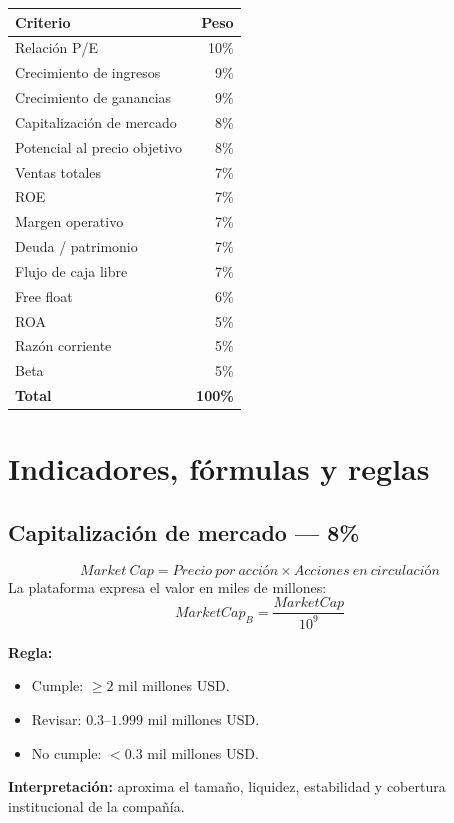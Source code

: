 \documentclass[11pt,a4paper]{article}
\begin{document}
\begin{center}
\begin{tabular}{lr}
\toprule
\textbf{Criterio} & \textbf{Peso}\\
\midrule
Relación P/E & 10\%\\
Crecimiento de ingresos & 9\%\\
Crecimiento de ganancias & 9\%\\
Capitalización de mercado & 8\%\\
Potencial al precio objetivo & 8\%\\
Ventas totales & 7\%\\
ROE & 7\%\\
Margen operativo & 7\%\\
Deuda / patrimonio & 7\%\\
Flujo de caja libre & 7\%\\
Free float & 6\%\\
ROA & 5\%\\
Razón corriente & 5\%\\
Beta & 5\%\\
\midrule
\textbf{Total} & \textbf{100\%}\\
\bottomrule
\end{tabular}
\end{center}

\section{Indicadores, fórmulas y reglas}

\subsection{Capitalización de mercado --- 8\%}
\[
\boxed{Market\ Cap = Precio\ por\ acción \times Acciones\ en\ circulación}
\]
La plataforma expresa el valor en miles de millones:
\[
MarketCap_B=\frac{MarketCap}{10^9}
\]

\textbf{Regla:}
\begin{itemize}[leftmargin=*]
\item Cumple: $\geq 2$ mil millones USD.
\item Revisar: $0.3$--$1.999$ mil millones USD.
\item No cumple: $<0.3$ mil millones USD.
\end{itemize}

\textbf{Interpretación:} aproxima el tamaño, liquidez, estabilidad y cobertura institucional de la compañía.
\end{document}
